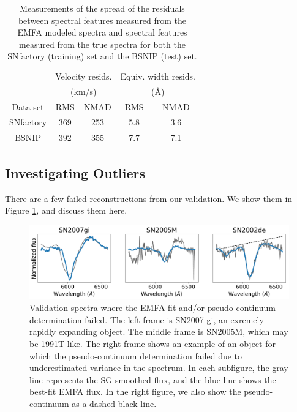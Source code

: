 \begin{table}[htbp]
    \centering
    \begin{tabular}{ccccc}\\\toprule
        & \multicolumn{2}{c}{Velocity resids.} & \multicolumn{2}{c}{Equiv. width resids.}\\
        & \multicolumn{2}{c}{(km/s)} & \multicolumn{2}{c}{(\AA)}\\
        Data set & RMS & NMAD & RMS & NMAD\\\midrule
        SNfactory & 369 & 253 & 5.8 & 3.6 \\
        BSNIP & 392 & 355 & 7.7 & 7.1 \\\bottomrule
    \end{tabular}
    \caption{Measurements of the spread of the residuals between spectral features measured from the EMFA modeled spectra and spectral features measured from the true spectra for both the SNfactory (training) set and the BSNIP (test) set.}
    \label{validation_results}
\end{table}

\subsection{Investigating Outliers}
\label{outliers}
There are a few failed reconstructions from our validation. We show them in Figure \ref{valid_failures}, and discuss them here.

\begin{figure}[htbp]
    \centering
    \includegraphics[width=\textwidth]{figures/si_feat_pca/fit_failures.pdf}
    \caption{Validation spectra where the EMFA fit and/or pseudo-continuum determination failed. The left frame is SN2007 gi, an exremely rapidly expanding object. The middle frame is SN2005M, which may be 1991T-like. The right frame shows an example of an object for which the pseudo-continuum determination failed due to underestimated variance in the spectrum. In each subfigure, the gray line represents the SG smoothed flux, and the blue line shows the best-fit EMFA flux. In the right figure, we also show the pseudo-continuum as a dashed black line.}
    \label{valid_failures}
\end{figure}

